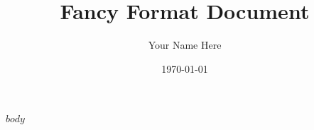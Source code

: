 \documentclass{article}
\begin{document}
    \title{Fancy Format Document}
    \author{Your Name Here}
    \date{\today}
    \maketitle
    $body$
\end{document}

